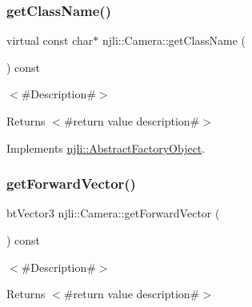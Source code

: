 \mbox{\label{classnjli_1_1_camera_ade06e4102661cf1f83a87160f3ebb372}} 
\subsubsection{\texorpdfstring{get\+Class\+Name()}{getClassName()}}
{\footnotesize\ttfamily virtual const char$\ast$ njli\+::\+Camera\+::get\+Class\+Name (\begin{DoxyParamCaption}{ }\end{DoxyParamCaption}) const\hspace{0.3cm}{\ttfamily [virtual]}}

$<$\#\+Description\#$>$

\begin{DoxyReturn}{Returns}
$<$\#return value description\#$>$ 
\end{DoxyReturn}


Implements \mbox{\hyperlink{classnjli_1_1_abstract_factory_object_af4151e41b80d5bc3fc42822c67fc2278}{njli\+::\+Abstract\+Factory\+Object}}.

\mbox{\label{classnjli_1_1_camera_a5ce9c9208b4eb42baf2bffc077bc6679}} 
\subsubsection{\texorpdfstring{get\+Forward\+Vector()}{getForwardVector()}}
{\footnotesize\ttfamily bt\+Vector3 njli\+::\+Camera\+::get\+Forward\+Vector (\begin{DoxyParamCaption}{ }\end{DoxyParamCaption}) const}

$<$\#\+Description\#$>$

\begin{DoxyReturn}{Returns}
$<$\#return value description\#$>$ 
\end{DoxyReturn}
\mbox{\label{classnjli_1_1_camera_aeca41e2beafd04a8394b9e40599a3222}} 
